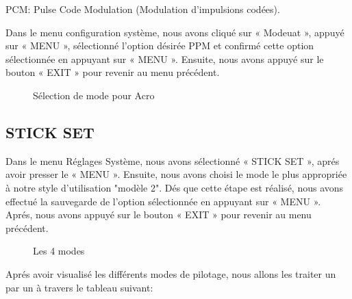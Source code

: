 PCM: Pulse Code Modulation (Modulation d'impulsions codées).


Dans le menu configuration système, nous avons cliqué sur « Modeuat », appuyé sur « MENU », sélectionné l'option désirée PPM et confirmé cette option sélectionnée en appuyant sur « MENU ». Ensuite, nous avons appuyé sur le bouton « EXIT » pour revenir au menu précédent.

\begin{figure}[h]
	\begin{center}
		\centering
	\end{center}
	\caption{Sélection de mode pour Acro}
\end{figure}
	\subsection{STICK SET }
	Dans le menu Réglages Système, nous avons sélectionné « STICK SET », aprés avoir presser le « MENU ». Ensuite, nous avons choisi le mode le plus appropriée à notre style d'utilisation "modèle 2". Dés que cette étape est réalisé, nous avons effectué la sauvegarde de l'option sélectionnée en appuyant sur « MENU ». Aprés, nous avons appuyé sur le bouton « EXIT » pour revenir au menu précédent.
	\begin{figure}[h]
		\begin{center}
			\centering
		\end{center}
		\caption{Les 4 modes}
	\end{figure}
\newpage
	Aprés avoir visualisé les différents modes de pilotage, nous allons les traiter un par un à travers le tableau suivant:
